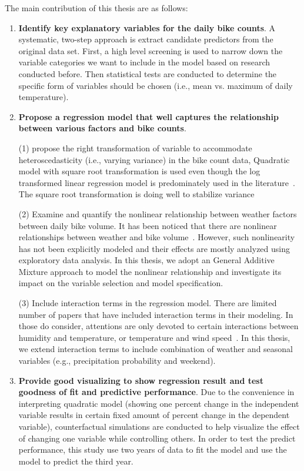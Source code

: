\documentclass [11pt, proquest] {uwthesis}[2015/03/03]
\begin{document}
The main contribution of this thesis are as follows:
\begin{enumerate}
\item \textbf{Identify key explanatory variables for the daily bike counts}. A systematic, two-step approach is extract candidate predictors from the original data set. First, a high level screening is used to narrow down the variable categories we want to include in the model based on research conducted before. Then statistical tests are conducted to determine the specific form of variables should be chosen (i.e., mean vs. maximum of daily temperature).
\item \textbf{Propose a regression model that well captures the relationship between various factors and bike counts}. 

(1) propose the right transformation of variable to accommodate heteroscedasticity (i.e., varying variance) in the bike count data, Quadratic model with square root transformation is used even though the log transformed linear regression model is predominately used in the literature~\cite{Nosal:2014aa,Thomas09,Ahmed12}. The square root transformation is doing well to stabilize variance 

(2) Examine and quantify the nonlinear relationship between weather factors between daily bike volume. It has been noticed that there are nonlinear relationships between weather and bike volume~\cite{Ahmed12,Miranda-Moreno:2011aa,Thomas12,Lewin:2011aa}. However, such nonlinearity has not been explicitly modeled and their effects are mostly analyzed using exploratory data analysis. In this thesis, we adopt an General Additive Mixture approach to model the nonlinear relationship and investigate its impact on the variable selection and model specification.

(3) Include interaction terms in the regression model. There are limited number of papers that have included interaction terms in their modeling. In those do consider, attentions are only devoted to certain interactions between humidity and temperature, or temperature and wind speed~\cite{Miranda-Moreno:2011aa}. In this thesis, we extend interaction terms to include combination of weather and seasonal variables (e.g., precipitation probability and weekend).

\item \textbf{Provide good visualizing to show regression result and test goodness of fit and predictive performance}. Due to the convenience in interpreting quadratic model (showing one percent change in the independent variable results in certain fixed amount of percent change in the dependent variable), counterfactual simulations are conducted to help visualize the effect of changing one variable while controlling others. In order to test the predict performance, this study use two years of data to fit the model and use the model to predict the third year. 



\end{enumerate}
\end{document}
